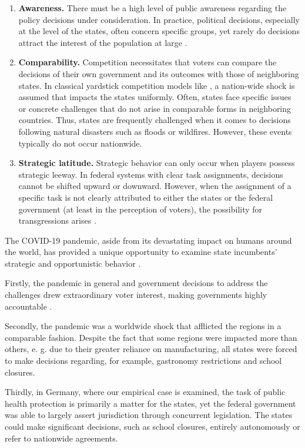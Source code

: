 \documentclass[12pt, abstracton]{scrartcl}
\begin{document}
\begin{enumerate}
\item \textbf{Awareness.} There must be a high level of public awareness regarding the policy decisions under consideration. In practice, political decisions, especially at the level of the states, often concern specific groups, yet rarely do decisions attract the interest of the population at large \citep{Boffa2015, Agrawal2022}.
%
\item \textbf{Comparability.} Competition necessitates that voters can compare the decisions of their own government and its outcomes with those of neighboring states. In classical yardstick competition models like  \cite{BesleyCase1995}, a nation-wide shock is assumed that impacts the states uniformly. Often, states face specific issues or concrete challenges that do not arise in comparable forms in neighboring countries. Thus, states are frequently challenged when it comes to decisions following natural disasters such as floods or wildfires. However, these events typically do not occur nationwide. 
\item \textbf{Strategic latitude.} Strategic behavior can only occur when players possess strategic leeway. In federal systems with clear task assignments, decisions cannot be shifted upward or downward. However, when the assignment of a specific task is not clearly attributed to either the states or the federal government (at least in the perception of voters), the possibility for transgressions arises \citep{Hinterleitner2023}.
\end{enumerate}

The COVID-19 pandemic, aside from its devastating impact on humans around the world, has provided a unique opportunity to examine state incumbents' strategic and opportunistic behavior \citep{Kennedy2022}. 

Firstly, the pandemic in general and government decisions to address the challenges drew extraordinary voter interest, making governments highly accountable \citep{Neundorf2021, Algara2022, Singer2022}.

Secondly, the pandemic was a worldwide shock that afflicted the regions in a comparable fashion. Despite the fact that some regions were impacted more than others, e. g.  due to their greater reliance on manufacturing, all states were forced to make decisions regarding, for example, gastronomy restrictions and school closures.

Thirdly, in Germany, where our empirical case is examined, the task of public health protection is primarily a matter for the states, yet the federal government was able to largely assert jurisdiction through concurrent legislation. The states could make significant decisions, such as school closures, entirely autonomously or refer to nationwide agreements.
\end{document}
